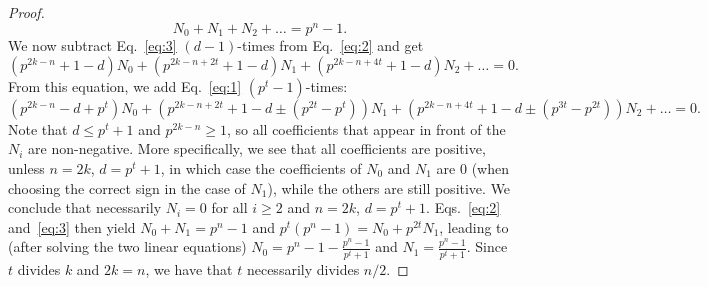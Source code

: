 \documentclass[10pt,a4paper]{amsart}
\begin{document}
\begin{proof}
    \begin{equation} \label{eq:3}
        {N_0}+N_1+N_2+\dots = p^n-1.
    \end{equation}
    We now subtract Eq.~\eqref{eq:3} $(d-1)$-times from Eq.~\eqref{eq:2} and get
    \[(p^{2k-n}+1-d)N_0+(p^{2k-n+2t}+1-d)N_1 + (p^{2k-n+4t}+1-d)N_2+\dots=0.\]
    From this equation, we add Eq.~\eqref{eq:1} $(p^t-1)$-times:
    \[(p^{2k-n}-d+p^t)N_0+(p^{2k-n+2t}+1-d\pm (p^{2t}- p^t))N_1+(p^{2k-n+4t}+1-d\pm(p^{3t}-p^{2t}))N_2+\dots =0.\]
    Note that $d\leq p^t+1$ and $p^{2k-n}\geq 1$, so all coefficients that appear in front of the $N_i$ are non-negative. More specifically, we see that all coefficients are positive, unless $n=2k$, $d=p^t+1$, in which case the coefficients of $N_0$ and $N_1$ are $0$ (when choosing the correct sign in the case of $N_1$), while the others are still positive. We conclude that necessarily $N_i=0$ for all $i \geq 2$ and $n=2k$, $d=p^t+1$. Eqs.~\eqref{eq:2} and~\eqref{eq:3} then yield $N_0+N_1=p^n-1$ and $p^t(p^n-1)=N_0+p^{2t}N_1$, leading to (after solving the two linear equations) $N_0=p^n-1-\frac{p^n-1}{p^t+1}$ and $N_1=\frac{p^n-1}{p^t+1}$. Since $t$ divides $k$ and $2k=n$, we have that $t$ necessarily divides $n/2$.
\end{proof}
\end{document}
